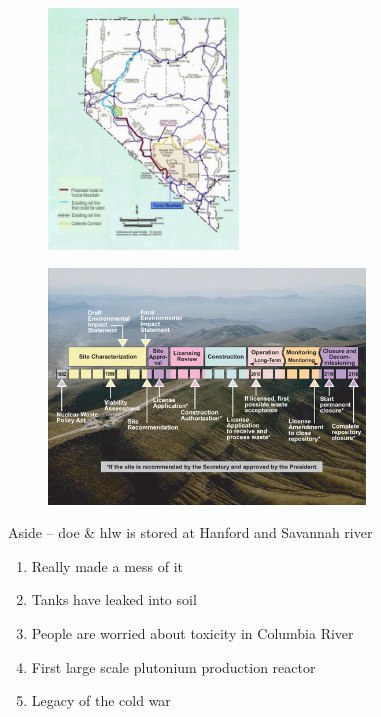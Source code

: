 \documentclass[aspectratio=1610,pdftex,dvipsnames,compress,xcolor={dvipsnames}]{beamer}
\newcommand{\acs}{\acrshort} %
\begin{document}
\begin{frame}{}
    \begin{figure}
        \centering
        \includegraphics[width=0.45\textwidth]{nevada.map.jpg}
    \end{figure}
\end{frame}


\begin{frame}{}
    \begin{figure}
        \centering
        \includegraphics[width=0.75\textwidth]{timeline.jpg}
    \end{figure}
\end{frame}


\begin{frame}{Aside -- \acs{doe} \& \acs{hlw} is stored at Hanford and Savannah river}
    \begin{enumerate}[series=outerlist,topsep=0pt,itemsep=21pt,leftmargin=*,label=(\arabic*)]
        \item[]Really made a mess of it
        \item[]Tanks have leaked into soil
        \item[]People are worried about toxicity in Columbia River
        \item[]First large scale plutonium production reactor
        \item[]Legacy of the cold war
    \end{enumerate}
\end{frame}
\end{document}
